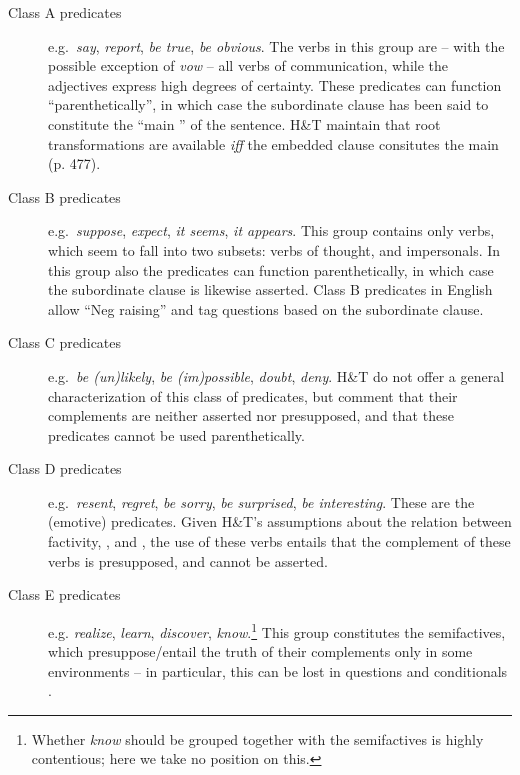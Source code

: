 \documentclass[output=paper]{langsci/langscibook}
\begin{document}
\begin{description}
\item[Class A predicates] e.g.\ \textit{say}, \textit{report}, \textit{be true}, \textit{be obvious}. The verbs in this group are -- with the possible exception of \textit{vow} -- all verbs of communication, while the adjectives express high degrees of certainty. These predicates can function ``parenthetically'', in which case the subordinate clause has been said to constitute the ``main '' of the sentence. H\&T maintain that root transformations are available \textit{iff} the embedded clause consitutes the main  (p. 477). 
\item[Class B predicates] e.g.\  \textit{suppose}, \textit{expect}, \textit{it seems},  \textit{it appears}. This group contains only verbs, which seem to fall into two subsets: verbs of thought, and impersonals. In this group also the predicates can function parenthetically, in which case the subordinate clause is likewise asserted. Class B predicates in English allow ``Neg raising'' and tag questions based on the subordinate clause.
\item[Class C predicates] e.g.\ \textit{be (un)likely}, \textit{be (im)possible}, \textit{doubt}, \textit{deny}.  H\&T do not offer a general characterization of this class of predicates, but comment that their complements are neither asserted nor presupposed, and that these predicates cannot be used parenthetically. 
\item[Class D predicates] e.g.\ \textit{resent}, \textit{regret}, \textit{be sorry}, \textit{be surprised}, \textit{be interesting}. These are the (emotive)  predicates. Given H\&T's assumptions about the relation between factivity, , and , the use of these verbs entails that the complement of these verbs is presupposed, and cannot be asserted.
\item[Class E predicates] e.g. \textit{realize}, \textit{learn}, \textit{discover}, \textit{know}.\footnote{Whether \textit{know} should be grouped together with the semifactives is highly contentious; here we take no position on this.}  This group constitutes the semifactives, which presuppose/entail the truth of their complements only in some environments -- in particular, this  can be lost in questions and conditionals \citep{KiparskyKiparsky1970}. 
 
\end{description}
\end{document}
